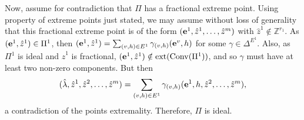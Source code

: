 \documentclass[opre,nonblindrev]{informs3} %
\newcommand{\bbZ}{\mathbb{Z}}
\newcommand{\Conv}{\operatorname{Conv}}
\newcommand{\ext}{\operatorname{ext}}
\begin{document}
\begin{APPENDICES}
        Now, assume for contradiction that $\Pi$ has a fractional extreme point. Using property of extreme points just stated, we may assume without loss of generality that this fractional extreme point is of the form $({\bf e}^1,\hat{z}^1,\ldots,\hat{z}^m)$ with $\hat{z}^1 \not\in \bbZ^{r_1}$. As $({\bf e}^1,\hat{z}^1) \in \Pi^1$, then $({\bf e}^1,\hat{z}^1) = \sum_{(v,h) \in E^1} \gamma_{(v,h)} ({\bf e}^v,h)$ for some $\gamma \in \Delta^{E^1}$. Also, as $\Pi^1$ is ideal and $\hat{z}^1$ is fractional, $({\bf e}^1,\hat{z}^1) \notin \ext(\Conv(\Pi^1))$, and so $\gamma$ must  have at least two non-zero components. But then
        \[
             (\hat{\lambda},\hat{z}^1,\hat{z}^2,\ldots,\hat{z}^m) = \sum_{(v,h) \in E^1} \gamma_{(v,h)} ({\bf e}^1,h,\hat{z}^2,\ldots,\hat{z}^m),
        \]
        a contradiction of the points extremality. Therefore, $\Pi$ is ideal.\Halmos
     \endproof



\end{APPENDICES}
\end{document}

